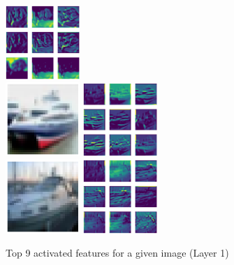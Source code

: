 \documentclass[11pt]{article}
\begin{document}
\begin{enumerate}
\begin{figure}[h!]
     \includegraphics[width=0.25\textwidth]{images/0_top_layers}\\
     \includegraphics[width=0.25\textwidth]{images/1_input_image}
     \includegraphics[width=0.25\textwidth]{images/1_top_layers}\\
     \includegraphics[width=0.25\textwidth]{images/2_input_image}
     \includegraphics[width=0.25\textwidth]{images/2_top_layers}
        \caption{Top 9 activated features for a given image (Layer 1)}
\end{figure}

\end{enumerate}
\end{document}
